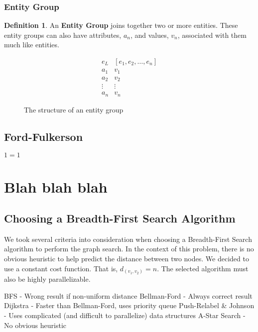 \documentclass[12pt,letterpaper,oneside,draft]{report}
\theoremstyle{definition}
\newtheorem{defn}{Definition}
\begin{document}
			\subsection{Entity Group}
				\begin{defn}
					An \textbf{Entity Group} joins together two or more entities.  These entity groups can also have attributes, $a_n$, and values, $v_n$, associated with them much like entities.

					\begin{figure}[!ht]
						\centering
						\[
							\begin{array}{ll}
								e_L & \left[ e_1, e_2, \ldots, e_n \right] \\
								a_1 & v_1 \\
								a_2 & v_2 \\
								\vdots & \vdots \\
								a_n & v_n
							\end{array}
						\]
						\caption{The structure of an entity group}
						\label{fig:entity-group-rep}
					\end{figure}

				\end{defn}

		\section{Ford-Fulkerson}
			\begin{algorithm}
				\begin{algorithmic}
					\ENSURE $1=1$
				\end{algorithmic}
			\end{algorithm}

	
	\chapter{Blah blah blah}
		\section{Choosing a Breadth-First Search Algorithm}
			We took several criteria into consideration when choosing a Breadth-First Search algorithm to perform the graph search.  In the context of this problem, there is no obvious heuristic to help predict the distance between two nodes.  We decided to use a constant cost function.  That is, $d_{(v_1, v_2)} = n$.  The selected algorithm must also be highly parallelizable.

			

			BFS - Wrong result if non-uniform distance
			Bellman-Ford - Always correct result
			Dijkstra - Faster than Bellman-Ford, uses priority queue
			Push-Relabel \& Johnson - Uses complicated (and difficult to parallelize) data structures
			A-Star Search - No obvious heuristic
	
	
\end{document}
